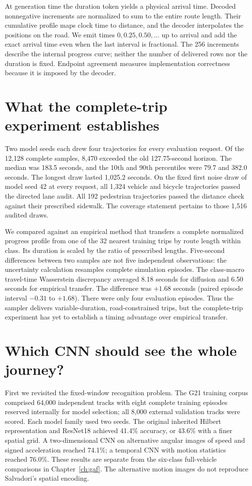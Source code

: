 At generation time the duration token yields a physical arrival time. Decoded nonnegative increments are normalized to sum to the entire route length. Their cumulative profile maps clock time to distance, and the decoder interpolates the positions on the road. We emit times $0,0.25,0.50,\ldots$ up to arrival and add the exact arrival time even when the last interval is fractional. The 256 increments describe the internal progress curve; neither the number of delivered rows nor the duration is fixed. Endpoint agreement measures implementation correctness because it is imposed by the decoder.

\section{What the complete-trip experiment establishes}
Two model seeds each drew four trajectories for every evaluation request. Of the 12,128 complete samples, 8,470 exceeded the old 127.75-second horizon. The median was 183.5 seconds, and the 10th and 90th percentiles were 79.7 and 382.0 seconds. The longest draw lasted 1,025.2 seconds. On the fixed first noise draw of model seed 42 at every request, all 1,324 vehicle and bicycle trajectories passed the directed lane audit. All 192 pedestrian trajectories passed the distance check against their prescribed sidewalk. The coverage statement pertains to those 1,516 audited draws.

We compared against an empirical method that transfers a complete normalized progress profile from one of the 32 nearest training trips by route length within class. Its duration is scaled by the ratio of prescribed lengths. Five-second differences between two samples are not five independent observations: the uncertainty calculation resamples complete simulation episodes. The class-macro travel-time Wasserstein discrepancy averaged 8.18 seconds for diffusion and 6.50 seconds for empirical transfer. The difference was $+1.68$ seconds (paired episode interval $-0.31$ to $+1.68$). There were only four evaluation episodes. Thus the sampler delivers variable-duration, road-constrained trips, but the complete-trip experiment has yet to establish a timing advantage over empirical transfer.

\section{Which CNN should see the whole journey?}
First we revisited the fixed-window recognition problem. The G21 training corpus comprised 64,000 independent tracks with eight complete training episodes reserved internally for model selection; all 8,000 external validation tracks were scored. Each model family used two seeds. The original inherited Hilbert representation and ResNet18 achieved 41.4\% accuracy, or 43.6\% with a finer spatial grid. A two-dimensional CNN on alternative angular images of speed and signed acceleration reached 74.1\%; a temporal CNN with motion statistics reached 76.0\%. These results are separate from the six-class full-vehicle comparisons in Chapter~\ref{ch:gaf}. The alternative motion images do not reproduce Salvadori's spatial encoding.

